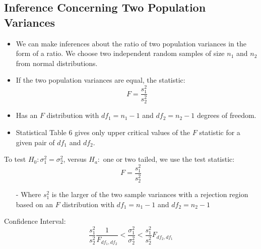 \documentclass[12pt, letterpaper]{article}
\begin{document}
        \subsection{Inference Concerning Two Population Variances}
            \begin{itemize}
                \item We can make inferences about the ratio of two population variances in the form of a ratio. We choose two independent random samples of size $n_1$ and $n_2$ from normal distributions.
                \item If the two population variances are equal, the statistic: $$F = \frac{s_1^2}{s_2^2}$$
                \item Has an $F$ distribution with $df_1 = n_1 - 1$ and $df_2 = n_2 - 1$ degrees of freedom.
                \item Statistical Table 6 gives only upper critical values of the $F$ statistic for a given pair of $df_1$ and $df_2$.
            \end{itemize}
            \begin{mdframed}[leftmargin=0.5cm, rightmargin=0.5cm]
                To test $H_0: \sigma_1^2 = \sigma_2^2$, versus $H_a: $ one or two tailed, we use the test statistic:
                \begin{equation*}
                    F = \frac{s_1^2}{s_2^2}
                \end{equation*}
                \begin{itemize}
                    \item[-] Where $s_1^2$ is the larger of the two sample variances with a rejection region based on an $F$ distribution with $df_1 = n_1 - 1$ and $df_2 = n_2 - 1$
                \end{itemize}
                Confidence Interval:
                \begin{equation*}
                    \frac{s_1^2}{s_2^2} \frac{1}{F_{df_1,df_2}} < \frac{\sigma_1^2}{\sigma_2^2} < \frac{s_1^2}{s_2^2} F_{df_2,df_1}
                \end{equation*}
            \end{mdframed}
\end{document}
